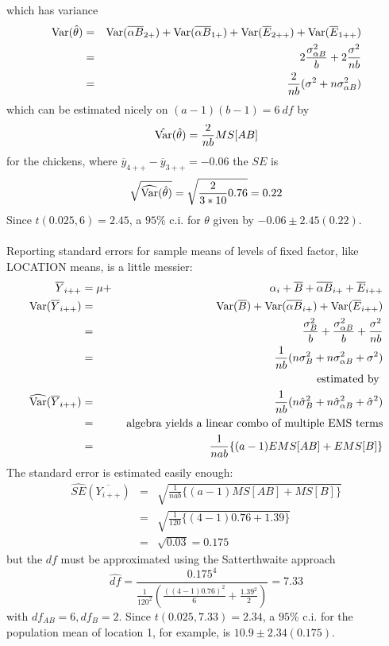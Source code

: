 which has variance
\begin{eqnarray*} 
\mbox{Var}(\hat\theta)&=& \mbox{Var}(\overline{\alpha B}_{2+}) + \mbox{Var}(\overline{\alpha B}_{1+}) 
+ \mbox{Var}(\overline{E}_{2++}) + \mbox{Var}(\overline{E}_{1++}) \\ 
 &=& 2 \frac{\sigma_{\alpha B}^2}{b} + 2 \frac{\sigma^2}{nb} \\
 &=& \frac{2}{nb} (\sigma^2 + n \sigma_{\alpha B}^2)
\end{eqnarray*} 
which can be estimated nicely on $(a-1)(b-1)=6~df$ by
$$\hat{\mbox{Var}}(\hat\theta) = \frac{2}{nb} MS[AB]$$
for the chickens, where $\overline{y}_{4++} - \overline{y}_{3++}=-0.06$ the $SE$ is
$$\sqrt{\widehat{\mbox{Var}}(\hat\theta)} = \sqrt{\frac{2}{3*10} 0.76} = 0.22$$
Since $t(0.025,6) =2.45$, a $95\%$ c.i. for $\theta$ given by $-0.06 \pm 2.45(0.22)$.\\~\\
Reporting standard errors for sample means of levels of fixed factor, like LOCATION means, is a little messier:
\begin{eqnarray*}
\overline{Y}_{i++} &= \mu + & \alpha_i + \overline{B} + \overline{\alpha B}_{i+} + \overline{E}_{i++} \\
\mbox{Var}(\overline{Y}_{i++}) &=& \mbox{Var}(\overline{B}) + \mbox{Var}(\overline{\alpha B}_{i+}) + \mbox{Var}(\overline{E}_{i++}) \\
& = & \frac{\sigma_B^2}{b} + \frac{\sigma_{\alpha B}^2}{b} + \frac{\sigma^2}{nb} \\
& = & \frac{1}{nb}(n\sigma_B^2 + n \sigma_{\alpha B}^2 + \sigma^2)\\
& & \mbox{ estimated by } \\
\widehat{\mbox{Var}}(\overline{Y}_{i++}) &=& 
\frac{1}{nb}(n\hat\sigma_B^2 + n \hat\sigma_{\alpha B}^2 + \hat\sigma^2) \\
& = & \mbox{ algebra yields a linear combo of multiple EMS terms} \\
& = & \frac{1}{nab}\{(a-1)EMS[AB] + EMS[B]\}
\end{eqnarray*}
The standard error is estimated easily enough:
\begin{eqnarray*}
\widehat{SE}(\overline{Y_{i++}}) & = & \sqrt{\frac{1}{nab}\{(a-1)MS[AB] + MS[B]\}} \\
&=& \sqrt{\frac{1}{120}\{(4-1)0.76 + 1.39\}} \\
& = & \sqrt{0.03} = 0.175
\end{eqnarray*}
but the $df$ must be approximated using the Satterthwaite approach
$$ \hat{df} = \frac{0.175^4}{\frac{1}{120^2}\left(\frac{((4-1)0.76)^2}{6} + 
\frac{1.39^2}{2}\right)} = 7.33 $$
with $df_{AB}=6,df_{B}=2$.  Since $t(0.025,7.33)=2.34$, a $95\%$ c.i.  for
the population mean of location 1, for example, is $10.9 \pm 2.34 (0.175)$.


